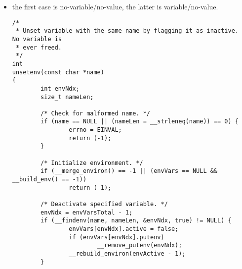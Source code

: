 \begin{itemize}
\begin{verbatim}
     [EINVAL]           The function getenv(), setenv() or unsetenv() failed
                        because the name is a NULL pointer, points to an empty
                        string, or points to a string containing an ``=''
                        character.
...
     [EFAULT]           The functions setenv(), unsetenv() or putenv() failed
                        to make a valid copy of the environment due to the
                        environment being corrupt (i.e., a name without a
                        value).  A warning will be output to stderr with
                        information about the issue.
\end{verbatim}
    \item the first case is no-variable/no-value, the latter is
    variable/no-value.
\begin{verbatim}
/*
 * Unset variable with the same name by flagging it as inactive.  No variable is
 * ever freed.
 */
int
unsetenv(const char *name)
{
        int envNdx;
        size_t nameLen;

        /* Check for malformed name. */
        if (name == NULL || (nameLen = __strleneq(name)) == 0) {
                errno = EINVAL;
                return (-1);
        }

        /* Initialize environment. */
        if (__merge_environ() == -1 || (envVars == NULL && __build_env() == -1))
                return (-1);

        /* Deactivate specified variable. */
        envNdx = envVarsTotal - 1;
        if (__findenv(name, nameLen, &envNdx, true) != NULL) {
                envVars[envNdx].active = false;
                if (envVars[envNdx].putenv)
                        __remove_putenv(envNdx);
                __rebuild_environ(envActive - 1);
        }


\end{verbatim}
\end{itemize}
